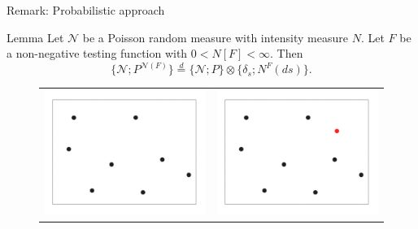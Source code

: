 \documentclass[xcolor=dvipsnames]{beamer}
\begin{document}
\begin{frame}{Remark: Probabilistic approach}
\begin{block}{Lemma}
Let $\mathcal N$ be a Poisson random measure with intensity measure $N$. 
Let $F$ be a non-negative testing function with $0 < N[F] < \infty$.
Then    
\[
      \{\mathcal N; P^{\mathcal N(F)}\}
      \overset{d}{=} \{\mathcal N ; P\} \otimes \{ \delta_s; N^F(ds)\}.
\]
\end{block}
  \begin{figure}[h]
    \begin{tabular}{ll}
      \includegraphics[scale=0.08]{001.jpg}
      &
        \includegraphics[scale=0.08]{002.jpg}
    \end{tabular}
  \end{figure}
\end{frame}
\end{document}
